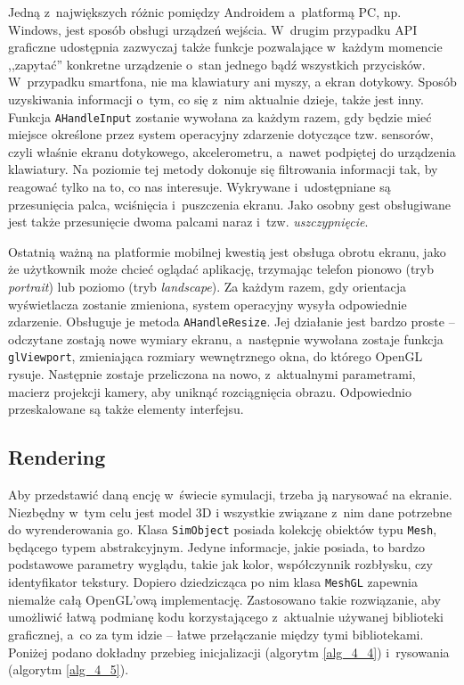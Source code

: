 		Jedną z~największych różnic pomiędzy Androidem a~platformą PC, np. Windows, jest sposób obsługi urządzeń wejścia. W~drugim przypadku API graficzne udostępnia zazwyczaj także funkcje pozwalające w~każdym momencie ,,zapytać'' konkretne urządzenie o~stan jednego bądź wszystkich przycisków. W~przypadku smartfona, nie ma klawiatury ani myszy, a ekran dotykowy. Sposób uzyskiwania informacji o~tym, co się z~nim aktualnie dzieje, także jest inny. Funkcja \texttt{AHandleInput} zostanie wywołana za każdym razem, gdy będzie mieć miejsce określone przez system operacyjny zdarzenie dotyczące tzw. sensorów, czyli właśnie ekranu dotykowego, akcelerometru, a~nawet podpiętej do urządzenia klawiatury. Na poziomie tej metody dokonuje się filtrowania informacji tak, by reagować tylko na to, co nas interesuje. Wykrywane i~udostępniane są przesunięcia palca, wciśnięcia i~puszczenia ekranu. Jako osobny gest obsługiwane jest także przesunięcie dwoma palcami naraz i~tzw. \emph{uszczypnięcie}.
		
		Ostatnią ważną na platformie mobilnej kwestią jest obsługa obrotu ekranu, jako że użytkownik może chcieć oglądać aplikację, trzymając telefon pionowo (tryb \emph{portrait}) lub poziomo (tryb \emph{landscape}). Za każdym razem, gdy orientacja wyświetlacza zostanie zmieniona, system operacyjny wysyła odpowiednie zdarzenie. Obsługuje je metoda \texttt{AHandleResize}. Jej działanie jest bardzo proste -- odczytane zostają nowe wymiary ekranu, a~następnie wywołana zostaje funkcja \texttt{glViewport}, zmieniająca rozmiary wewnętrznego okna, do którego OpenGL rysuje. Następnie zostaje przeliczona na nowo, z~aktualnymi parametrami, macierz projekcji kamery, aby uniknąć rozciągnięcia obrazu. Odpowiednio przeskalowane są także elementy interfejsu.
		
		\subsection{Rendering}
		\label{t:praktyka:silnik:render}
		
		
		Aby przedstawić daną encję w~świecie symulacji, trzeba ją narysować na ekranie. Niezbędny w~tym celu jest model 3D i wszystkie związane z~nim dane potrzebne do wyrenderowania go. Klasa \texttt{SimObject} posiada kolekcję obiektów typu \texttt{Mesh}, będącego typem abstrakcyjnym. Jedyne informacje, jakie posiada, to bardzo podstawowe parametry wyglądu, takie jak kolor, współczynnik rozbłysku, czy identyfikator tekstury. Dopiero dziedzicząca po nim klasa \texttt{MeshGL} zapewnia niemalże całą OpenGL'ową implementację. Zastosowano takie rozwiązanie, aby umożliwić łatwą podmianę kodu korzystającego z~aktualnie używanej biblioteki graficznej, a~co za tym idzie -- łatwe przełączanie między tymi bibliotekami. Poniżej podano dokładny przebieg inicjalizacji (algorytm \ref{alg_4_4}) i~rysowania (algorytm \ref{alg_4_5}).
		\newline
		
